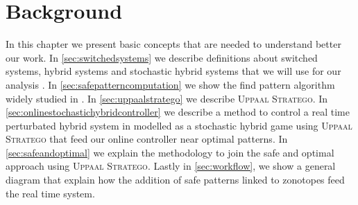 \chapter{Background}
\label{ch:background}
In this chapter we present basic concepts that are needed 
to understand better our work. In \autoref{sec:switchedsystems} 
we describe definitions about switched systems, hybrid systems and  
stochastic hybrid systems that we will use for our analysis 
\cite{sanfelice2020hybrid}. 
In \autoref{sec:safepatterncomputation} we show the
find pattern algorithm widely studied in \cite{le2017improved}. 
In \autoref{sec:uppaalstratego} we describe 
\textsc{Uppaal Stratego}. In \autoref{sec:onlinestochastichybridcontroller}
 we describe a method to control a real time perturbated hybrid system in 
 modelled as a stochastic hybrid game using \textsc{Uppaal Stratego}
 that feed our online controller near optimal patterns. In 
 \autoref{sec:safeandoptimal} we explain the 
 methodology to join the safe and optimal approach using \textsc{Uppaal Stratego}. Lastly in 
\autoref{sec:workflow}, we show a general diagram that explain 
how the addition of safe patterns linked to zonotopes feed the real time system.
\clearpage
